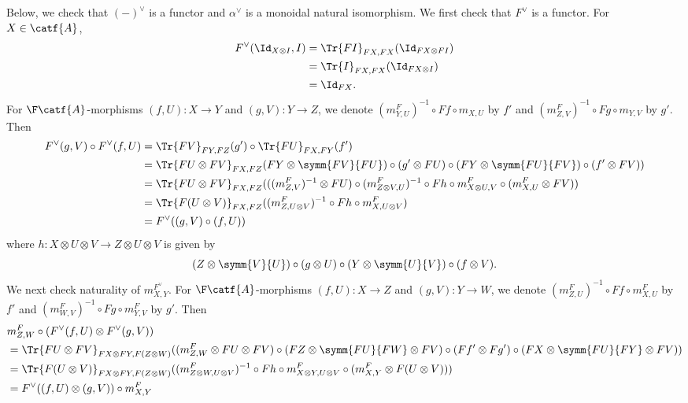 Below, we check that \((-)^{\vee}\) is a functor and \(\alpha^{\vee}\)
is a monoidal natural isomorphism.
We first check that \(F^{\vee}\) is a functor. For \(X \in \catf{A}\),
\begin{align*}
  F^{\vee}(\Id_{X \otimes I},I)
  &= \Tr{FI}_{FX,FX}(\Id_{FX \otimes FI}) \\
  &= \Tr{I}_{FX,FX}(\Id_{FX \otimes I}) \\
  &= \Id_{FX}.
\end{align*}
For \(\F\catf{A}\)-morphisms \((f,U) \colon X \to Y\) and \((g,V)
\colon Y \to Z\), we denote \((m_{Y,U}^{F})^{-1} \circ Ff \circ
m_{X,U}\) by \(f'\) and \((m_{Z,V}^{F})^{-1} \circ Fg \circ m_{Y,V}\)
by \(g'\). Then
\begin{align*}
  F^{\vee}(g,V) \circ F^{\vee}(f,U)
  &= \Tr{FV}_{FY,FZ}(g') \circ \Tr{FU}_{FX,FY}(f') \\
  &= \Tr{FU \otimes FV}_{FX,FZ}(FY \otimes \symm{FV}{FU}) \circ
  (g' \otimes FU) \circ (FY \otimes \symm{FU}{FV}) \circ (f' \otimes FV)) \\
  &= \Tr{FU \otimes FV}_{FX,FZ}(((m_{Z,V}^{F})^{-1} \otimes FU) \circ
  (m_{Z \otimes V,U}^{F})^{-1} \circ
  Fh \circ m_{X \otimes U,V}^{F} \circ (m_{X,U}^{F} \otimes FV)) \\
  &= \Tr{F(U \otimes V)}_{FX,FZ}((m_{Z,U \otimes V}^{F})^{-1} \circ
  Fh \circ m_{X, U \otimes V}^{F}) \\
  &= F^{\vee}((g,V) \circ (f,U))
\end{align*}
where \(h \colon X \otimes U \otimes V \to Z \otimes U \otimes V\) is given by
\begin{equation*}
  (Z \otimes \symm{V}{U}) \circ (g \otimes U) \circ (Y \otimes \symm{U}{V})
  \circ (f \otimes V).
\end{equation*}
We next check naturality of \(m^{F^{\vee}}_{X,Y}\). For
\(\F\catf{A}\)-morphisms \((f,U) \colon X \to Z\) and \((g,V) \colon Y
\to W\), we denote \((m^{F}_{Z,U})^{-1} \circ Ff \circ m^{F}_{X,U}\) by
\(f'\) and \((m_{W,V}^{F})^{-1} \circ Fg \circ m^{F}_{Y,V}\) by \(g'\). Then
\begin{align*}
  &m^{F}_{Z,W} \circ (F^{\vee}(f,U) \otimes F^{\vee}(g,V)) \\
  &= \Tr{FU \otimes FV}_{FX \otimes FY,F(Z \otimes W)}
  ((m^{F}_{Z,W} \otimes FU \otimes FV) \circ
  (FZ \otimes \symm{FU}{FW} \otimes FV) \circ
  (Ff' \otimes Fg') \circ
  (FX \otimes \symm{FU}{FY} \otimes FV)) \\
  &= \Tr{F(U \otimes V)}_{FX \otimes FY,F(Z \otimes W)}
  ((m_{Z \otimes W, U \otimes V}^{F})^{-1} \circ
  Fh \circ
  m_{X \otimes Y, U \otimes V}^{F} \circ
  (m_{X,Y}^{F} \otimes F(U \otimes V))) \\
  &= F^{\vee}((f,U) \otimes (g,V)) \circ m^{F}_{X,Y}
\end{align*}
